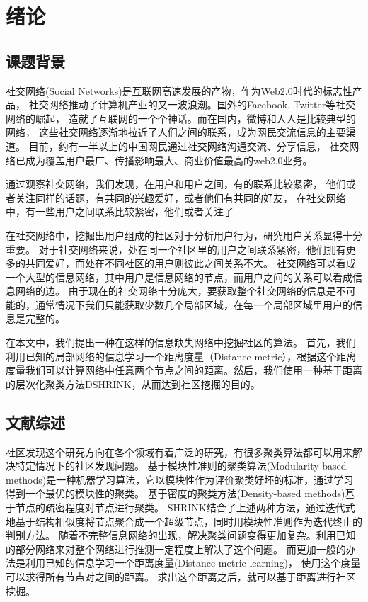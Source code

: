\chapter{绪论}
\label{chap:intro}

\section{课题背景}

社交网络(Social Networks)是互联网高速发展的产物，作为Web2.0时代的标志性产品，
社交网络推动了计算机产业的又一波浪潮。国外的Facebook, Twitter等社交网络的崛起，
造就了互联网的一个个神话。而在国内，微博和人人是比较典型的网络，
这些社交网络逐渐地拉近了人们之间的联系，成为网民交流信息的主要渠道。
目前，约有一半以上的中国网民通过社交网络沟通交流、分享信息，
社交网络已成为覆盖用户最广、传播影响最大、商业价值最高的web2.0业务。

通过观察社交网络，我们发现，在用户和用户之间，有的联系比较紧密，
他们或者关注同样的话题，有共同的兴趣爱好，或者他们有共同的好友，
在社交网络中，有一些用户之间联系比较紧密，他们或者关注了

在社交网络中，挖掘出用户组成的社区对于分析用户行为，研究用户关系显得十分重要。
对于社交网络来说，处在同一个社区里的用户之间联系紧密，他们拥有更多的共同爱好，而处在不同社区的用户则彼此之间关系不大。
社交网络可以看成一个大型的信息网络，其中用户是信息网络的节点，而用户之间的关系可以看成信息网络的边。
由于现在的社交网络十分庞大，要获取整个社交网络的信息是不可能的，通常情况下我们只能获取少数几个局部区域，在每一个局部区域里用户的信息是完整的。

在本文中，我们提出一种在这样的信息缺失网络中挖掘社区的算法。
首先，我们利用已知的局部网络的信息学习一个距离度量（Distance metric），根据这个距离度量我们可以计算网络中任意两个节点之间的距离。然后，我们使用一种基于距离的层次化聚类方法DSHRINK，从而达到社区挖掘的目的。

\section{文献综述}

社区发现这个研究方向在各个领域有着广泛的研究，有很多聚类算法都可以用来解决特定情况下的社区发现问题。
基于模块性准则的聚类算法(Modularity-based methods)是一种机器学习算法，它以模块性作为评价聚类好坏的标准，通过学习得到一个最优的模块性的聚类。
基于密度的聚类方法(Density-based methods)基于节点的疏密程度对节点进行聚类。
SHRINK结合了上述两种方法，通过迭代式地基于结构相似度将节点聚合成一个超级节点，同时用模块性准则作为迭代终止的判别方法。
随着不完整信息网络的出现，解决聚类问题变得更加复杂。利用已知的部分网络来对整个网络进行推测一定程度上解决了这个问题。
而更加一般的办法是利用已知的信息学习一个距离度量(Distance metric learning)，
使用这个度量可以求得所有节点对之间的距离。
求出这个距离之后，就可以基于距离进行社区挖掘。

